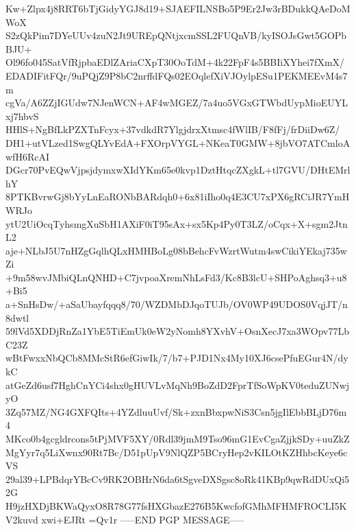Kw+Zlpx4j8RRT6bTjGidyYGJ8d19+SJAEFILNSBo5P9Er2Jw3rBDukkQAeDoMWoX
S2zQkPim7DYeUUv4zuN2Jt9UREpQNtjxcmSSL2FUQnVB/kyISOJsGwt5GOPbBJU+
Ol96fo045SatVfRjpbaEDlZAriaCXpT30OoTdM+4k22FpF4s5BBIiXYhei7fXmX/
EDADIFitFQr/9uPQjZ9P8bC2nrffdFQs02EOqlefXiVJOylpESu1PEKMEEvM4s7m
cgVa/A6ZZjIGUdw7NJenWCN+AF4wMGEZ/7a4uo5VGxGTWbdUypMioEUYLxj7hbvS
HHlS+NgBfLkPZXTnFcyx+37vdkdR7YlgjdrxXtmsc4fWlIB/F8fFj/frDiiDw6Z/
DH1+utVLzed1SwgQLYvEdA+FXOrpVYGL+NKeaT0GMW+8jbVO7ATCmloAwfH6RcAI
DGcr70PvEQwVjpsjdymxwXIdYKm65e0kvp1DztHtqcZXgkL+tl7GVU/DHtEMrlhY
8PTKBvrwGj8bYyLnEaRONbBARdqh0+6x81iIho0q4E3CU7xPX6gRCiJR7YmHWRJo
ytU2UiOcqTyhsmgXuSbH1AXiF0iT95sAx+sx5Kp4Py0T3LZ/oCqx+X+sgm2JtnL2
aje+NLbJ5U7nHZgGqlhQLxHMHBoLg08bBehcFvWzrtWutm4swCikiYEkaj735wZi
+9m58wvJMbiQLnQNHD+C7jvpoaXremNhLsFd3/Kc8B3lcU+SHPoAghsq3+u8+Bi5
a+SnHsDw/+aSaUbayfqqq8/70/WZDMbDJqoTUJb/OV0WP49UDOS0VqjJT/n8dwtl
59lVd5XDDjRnZa1YbE5TiEmUk0eW2yNomh8YXvhV+OsnXecJ7xa3WOpv77LbC23Z
wBtFwxxNbQCb8MMcStR6efGiwIk/7/b7+PJD1Nx4My10XJ6csePfuEGur4N/dykC
atGeZd6usf7HghCnYCi4shx0gHUVLvMqNh9BoZdD2FprTfSoWpKV0teduZUNwjyO
3Zq57MZ/NG4GXFQIts+4YZdluuUvf/Sk+zxnBbxpwNiS3Csn5jgIlEbbBLjD76m4
MKco0b4gcgldrcons5tPjMVF5XY/0Rdl39jmM9Tso96mG1EvCgaZjjkSDy+uuZkZ
MgYyr7q5LiXwnx90Rt7Bc/D51pUpV9NlQZP5BCryHep2vKILOtKZHhbcKeye6cVS
29al39+LPBdqrYBcCv9RK2OBHrN6da6tSgveDXSgsc8oRk41KBp9qwRdDUxQi52G
H9jzHXDjBKWaQyxO8R78G77fsHXGbazE276B5KwcfofGMhMFHMFROCLI5KV2kuvd
xwi+EJRt
=Qv1r
-----END PGP MESSAGE-----
